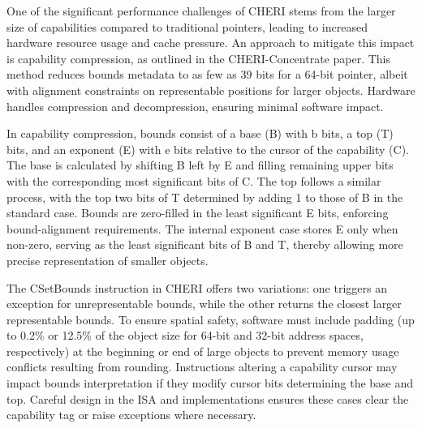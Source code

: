 One of the significant performance challenges of CHERI stems from the larger size of capabilities compared to traditional pointers, leading to 
increased hardware resource usage and cache pressure. 
An approach to mitigate this impact is capability compression, as outlined in the CHERI-Concentrate paper. This method reduces bounds metadata 
to as few as 39 bits for a 64-bit pointer, albeit with alignment constraints on representable positions for larger objects. Hardware handles 
compression and decompression, ensuring minimal software impact.

In capability compression, bounds consist of a base (B) with b bits, a top (T) bits, and 
an exponent (E) with e bits relative to the cursor of the capability (C). The base is calculated by shifting B 
left by E and filling remaining upper bits with the corresponding most significant bits of C. The top follows a 
similar process, with the top two bits of T determined by adding 1 to those of B in the standard case. Bounds 
are zero-filled in the least significant E bits, enforcing bound-alignment requirements. The internal exponent case stores E only 
when non-zero, serving as the least significant bits of B and T, thereby allowing more precise representation of smaller objects.

The CSetBounds instruction in CHERI offers two variations: one triggers an exception for unrepresentable bounds, while the other returns 
the closest larger representable bounds. To ensure spatial safety, software must include padding (up to 0.2\% or 12.5\% of the object size 
for 64-bit and 32-bit address spaces, respectively) at the beginning or end of large objects to prevent memory usage conflicts resulting 
from rounding. Instructions altering a capability cursor may impact bounds interpretation if they modify cursor bits determining the 
base and top. Careful design in the ISA and implementations ensures these cases clear the capability tag or raise exceptions where necessary.














